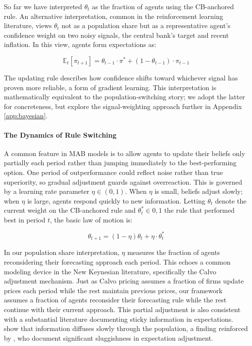 \documentclass[10pt]{article}
\begin{document}
So far we have interpreted $\theta_t$ as the fraction of agents using the CB-anchored rule. An alternative interpretation, common in the reinforcement learning literature, views $\theta_t$ not as a population share but as a representative agent's confidence weight on two noisy signals, the central bank's target and recent inflation. In this view, agents form expectations as:

\begin{equation}
\mathbb{E}_t[\pi_{t+1}] = \theta_{t-1} \cdot \pi^* + (1-\theta_{t-1}) \cdot \pi_{t-1}
\end{equation}

The updating rule describes how confidence shifts toward whichever signal has proven more reliable, a form of gradient learning. This interpretation is mathematically equivalent to the population-switching story; we adopt the latter for concreteness, but explore the signal-weighting approach further in Appendix \ref{app:bayesian}.

\paragraph{The Dynamics of Rule Switching}

A common feature in MAB models is to allow agents to update their beliefs only partially each period rather than jumping immediately to the best-performing option. One period of outperformance could reflect noise rather than true superiority, so gradual adjustment guards against overreaction. This is governed by a learning rate parameter $\eta \in (0,1)$. When $\eta$ is small, beliefs adjust slowly; when $\eta$ is large, agents respond quickly to new information. Letting $\theta_t$ denote the current weight on the CB-anchored rule and $\theta^*_t \in 0,1$ the rule that performed best in period $t$, the basic law of motion is:
  
\begin{equation}
\theta_{t+1} = (1-\eta)\theta_t + \eta \cdot \theta^*_t
\end{equation}

In our population share interpretation, $\eta$ measures the fraction of agents reconsidering their forecasting approach each period. This echoes a common modeling device in the New Keynesian literature, specifically the Calvo adjustment mechanism. Just as Calvo pricing assumes a fraction of firms update prices each period while the rest maintain previous prices, our framework assumes a fraction of agents reconsider their forecasting rule while the rest continue with their current approach. This partial adjustment is also consistent with a substantial literature documenting sticky information in expectations. \citet{mankiw2002sticky} show that information diffuses slowly through the population, a finding reinforced by \citet{coibion2015information}, who document significant sluggishness in expectation adjustment.
\end{document}
